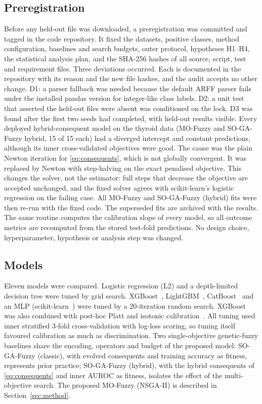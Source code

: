 \subsection{Preregistration}
Before any held-out file was downloaded, a preregistration was committed and tagged in
the code repository. It fixed the datasets, positive classes, method configuration,
baselines and search budgets, outer protocol, hypotheses H1--H4, the statistical
analysis plan, and the SHA-256 hashes of all source, script, test and requirement
files. Three deviations occurred. Each is documented in the repository with its reason
and the new file hashes, and the audit accepts no other change. D1: a parser fallback
was needed because the default ARFF parser fails under the installed pandas version for
integer-like class labels. D2: a unit test that asserted the held-out files were absent
was conditioned on the lock. D3 was found after the first two seeds had completed,
with held-out results visible. Every deployed hybrid-consequent model on the thyroid
data (MO-Fuzzy and SO-GA-Fuzzy hybrid, 15 of 15 each) had a diverged intercept and
constant predictions, although its inner cross-validated objectives were good. The
cause was the plain Newton iteration for \eqref{eq:consequents}, which is not globally
convergent. It was replaced by Newton with step-halving on the exact penalised
objective. This changes the solver, not the estimator: full steps that decrease the
objective are accepted unchanged, and the fixed solver agrees with scikit-learn's
logistic regression on the failing case. All MO-Fuzzy and SO-GA-Fuzzy (hybrid) fits
were then re-run with the fixed code. The superseded fits are archived with the
results. The same routine computes the calibration slope of every model, so all
outcome metrics are recomputed from the stored test-fold predictions. No design
choice, hyperparameter, hypothesis or analysis step was changed.

\subsection{Models}
Eleven models were compared. Logistic regression (L2) and a depth-limited decision
tree were tuned by grid search. XGBoost~\cite{chen2016}, LightGBM~\cite{ke2017},
CatBoost~\cite{prokhorenkova2018} and an MLP (scikit-learn~\cite{pedregosa2011}) were
tuned by a 20-iteration random search. XGBoost was also combined with post-hoc
Platt and isotonic calibration~\cite{zadrozny2002,niculescu2005}. All tuning used inner
stratified 3-fold cross-validation with log-loss scoring, so tuning itself
favoured calibration as much as discrimination. Two single-objective genetic-fuzzy
baselines share the encoding, operators and budget of the proposed model:
SO-GA-Fuzzy (classic), with evolved consequents and training accuracy as fitness,
represents prior practice; SO-GA-Fuzzy (hybrid), with the hybrid consequents of
\eqref{eq:consequents} and inner AUROC as fitness, isolates the effect of the
multi-objective search. The proposed MO-Fuzzy (NSGA-II) is described in
Section~\ref{sec:method}.

